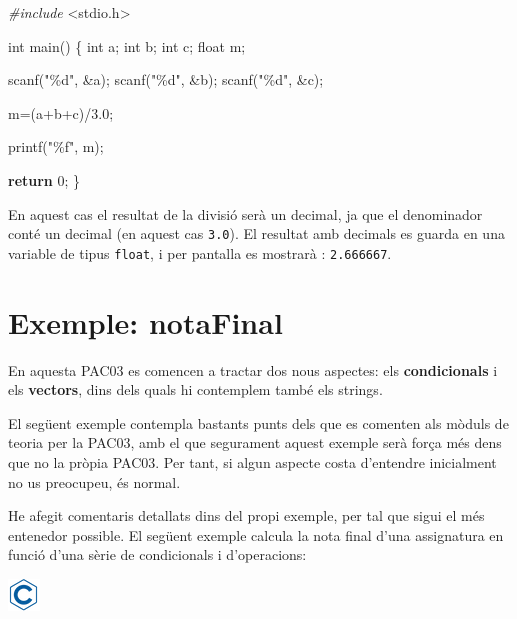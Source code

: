 \documentclass[]{book}
\newenvironment{Shaded}{\begin{snugshade}}{\end{snugshade}}
\newcommand{\ControlFlowTok}[1]{\textcolor[rgb]{0.13,0.29,0.53}{\textbf{#1}}}
\newcommand{\DataTypeTok}[1]{\textcolor[rgb]{0.13,0.29,0.53}{#1}}
\newcommand{\DecValTok}[1]{\textcolor[rgb]{0.00,0.00,0.81}{#1}}
\newcommand{\FloatTok}[1]{\textcolor[rgb]{0.00,0.00,0.81}{#1}}
\newcommand{\ImportTok}[1]{#1}
\newcommand{\NormalTok}[1]{#1}
\newcommand{\PreprocessorTok}[1]{\textcolor[rgb]{0.56,0.35,0.01}{\textit{#1}}}
\newcommand{\StringTok}[1]{\textcolor[rgb]{0.31,0.60,0.02}{#1}}
\begin{document}
\begin{Shaded}
\begin{Highlighting}[]
\PreprocessorTok{\#include }\ImportTok{\textless{}stdio.h\textgreater{}}

\DataTypeTok{int}\NormalTok{ main() \{}
   \DataTypeTok{int}\NormalTok{ a;}
   \DataTypeTok{int}\NormalTok{ b;}
   \DataTypeTok{int}\NormalTok{ c;}
   \DataTypeTok{float}\NormalTok{ m;}

\NormalTok{   scanf(}\StringTok{"\%d"}\NormalTok{, \&a);}
\NormalTok{   scanf(}\StringTok{"\%d"}\NormalTok{, \&b);}
\NormalTok{   scanf(}\StringTok{"\%d"}\NormalTok{, \&c);}

\NormalTok{   m=(a+b+c)/}\FloatTok{3.0}\NormalTok{;}

\NormalTok{   printf(}\StringTok{"\%f"}\NormalTok{, m);}

   \ControlFlowTok{return} \DecValTok{0}\NormalTok{;}
\NormalTok{\}}
\end{Highlighting}
\end{Shaded}

En aquest cas el resultat de la divisió serà un decimal, ja que el denominador conté un decimal (en aquest cas \texttt{3.0}). El resultat amb decimals es guarda en una variable de tipus \texttt{float}, i per pantalla es mostrarà : \texttt{2.666667}.

\hypertarget{exemple-notafinal}{%
\section{Exemple: notaFinal}\label{exemple-notafinal}}

En aquesta PAC03 es comencen a tractar dos nous aspectes: els \textbf{condicionals} i els \textbf{vectors}, dins dels quals hi contemplem també els strings.

El següent exemple contempla bastants punts dels que es comenten als mòduls de teoria per la PAC03, amb el que segurament aquest exemple serà força més dens que no la pròpia PAC03. Per tant, si algun aspecte costa d'entendre inicialment no us preocupeu, és normal.

He afegit comentaris detallats dins del propi exemple, per tal que sigui el més entenedor possible. El següent exemple calcula la nota final d'una assignatura en funció d'una sèrie de condicionals i d'operacions:

\includegraphics{./img/c.png}
\end{document}
